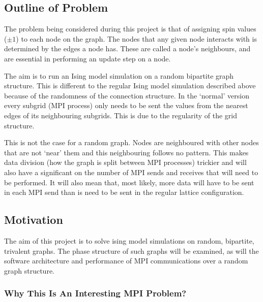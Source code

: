 \documentclass[pdftex,12pt,a4paper]{article}
\begin{document}




\subsection{Outline of Problem}

The problem being considered during this project is that of assigning spin values ($\pm1$) to each node on the graph. The nodes that any given node interacts with is determined by the edges a node has. These are called a node's neighbours, and are essential in performing an update step on a node.

The aim is to run an Ising model simulation on a random bipartite graph structure. This is different to the regular Ising model simulation described above because of the randomness of the connection structure. In the `normal' version every subgrid (MPI process) only needs to be sent the values from the nearest edges of its neighbouring subgrids. This is due to the regularity of the grid structure.

This is not the case for a random graph. Nodes are neighboured with other nodes that are not `near' them and this neighbouring follows no pattern. This makes data division (how the graph is split between MPI processes) trickier and will also have a significant on the number of MPI sends and receives that will need to be performed. It will also mean that, most likely, more data will have to be sent in each MPI send than is need to be sent in the regular lattice configuration.


\subsection{Motivation}

The aim of this project is to solve ising model simulations on random, bipartite, trivalent graphs. The phase structure of such graphs will be examined, as will the software architecture and performance of MPI communications over a random graph structure.


\subsubsection{Why This Is An Interesting MPI Problem?}
\end{document}
